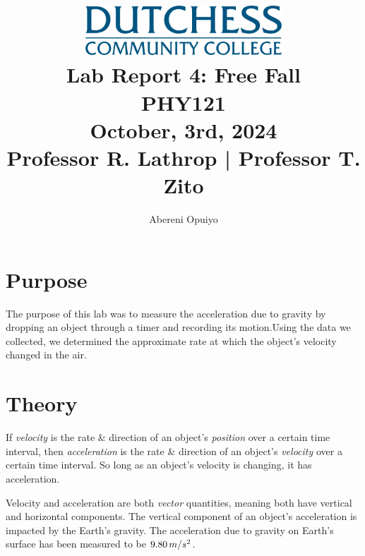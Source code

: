 \documentclass[a4paper,12pt]{article}
\title{
    \vspace{5cm} %
    \includegraphics[width=0.55\textwidth]{dutchess-logo-blue.png} \\ %
    \vspace{1cm} %
    \textbf{\Huge Lab Report 4: Free Fall} \\
    \vspace{1cm} %
    \large PHY121 \\
    \vspace{0.5cm} %
    \large	October, 3rd, 2024 \\ 
		\vspace{.5cm}
		\large Professor R. Lathrop | Professor T. Zito
}
\author{Abereni Opuiyo}
\date{}
\begin{document}
\maketitle
	\thispagestyle{empty}
\newpage




\setcounter{secnumdepth}{0}
\setcounter{page}{1}  %
\tableofcontents
\thispagestyle{fancy}
\newpage




\section{Purpose}
\vspace{-0.5cm}
\singlespacing
The purpose of this lab was to measure the acceleration due to gravity by dropping an object through a timer and recording its motion.Using the data we collected, we determined the approximate rate at which the object's velocity changed in the air.




\section{Theory}
\vspace{-0.5cm}
\singlespacing

\indent If \textit{velocity} is the rate \& direction of an object's \textit{position} over a certain time interval, then \textit{acceleration} is the rate \& direction of an object's \textit{velocity} over a certain time interval. So long as an object's velocity is changing, it has acceleration.\par 


Velocity and acceleration are both \textit{vector} quantities, meaning both have vertical and horizontal components. The vertical component of an object's acceleration is impacted by the Earth's gravity. The acceleration due to gravity on Earth's surface has been measured to be \textit{$9.80\thinspace{m/s^2}$}. \par
\end{document}
